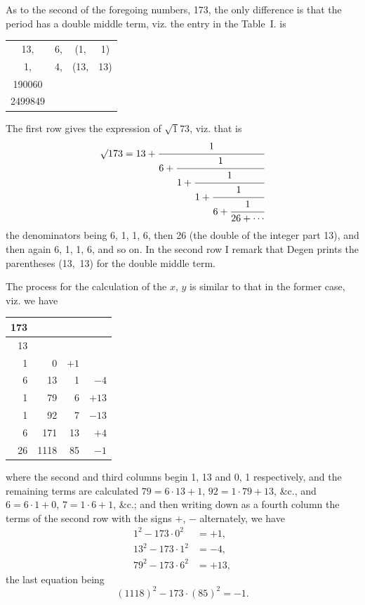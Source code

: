 \documentclass[11pt,a4paper]{book}
\begin{document}
{{{\newpage
As to the second of the foregoing numbers, 173, the only difference is that the period has a double middle term, viz. the entry in the Table~I. is
\begin{center}
\begin{tabular}{cccc}
13, & 6, & (\phantom{1}1, & \phantom{1}1) \\
1, & 4, & (13, & 13) \\
190060 & & & \\
2499849 & & &
\end{tabular}
\end{center}
The first row gives the expression of $\surd 173$, viz. that is
\[
\surd 173 = 13 +
\cfrac{1}{6+
 \cfrac{1}{1+
  \cfrac{1}{1+
   \cfrac{1}{6+
    \cfrac{1}{26+\cdots}}}}
}
\]
the denominators being 6, 1, 1, 6, then 26 (the double of the integer part 13), and then again 6, 1, 1, 6, and so on. In the second row I remark that Degen prints the parentheses (13,~13) for the double middle term.

The process for the calculation of the $x$, $y$ is similar to that in the former case, viz. we have

\begin{center}
\begin{tabular}{r|r|r|r}
173 & & & \\ \hline
13 & & & \\
1 & 0 & $+1$ & \\
6 & 13 & 1 & $-4$ \\
1 & 79 & 6 & $+13$ \\
1 & 92 & 7 & $-13$ \\
6 & 171 & 13 & $+4$ \\
26 & 1118 & 85 & $-1$
\end{tabular}
\end{center}

where the second and third columns begin 1, 13 and 0, 1 respectively, and the remaining terms are calculated $79 = 6 \cdot 13 + 1$, $92 = 1 \cdot 79 + 13$, \&c., and $6 = 6 \cdot 1 + 0$, $7 = 1 \cdot 6 + 1$, \&c.; and then writing down as a fourth column the terms of the second row with the signs $+$, $-$ alternately, we have
\[
\begin{aligned}
1^{2} - 173 \cdot 0^{2} &= +1, \\
13^{2} - 173 \cdot 1^{2} &= -4, \\
79^{2} - 173 \cdot 6^{2} &= +13,
\end{aligned}
\]
the last equation being
\[ (1118)^{2} - 173 \cdot (85)^{2} = -1. \]

}}}
\end{document}
